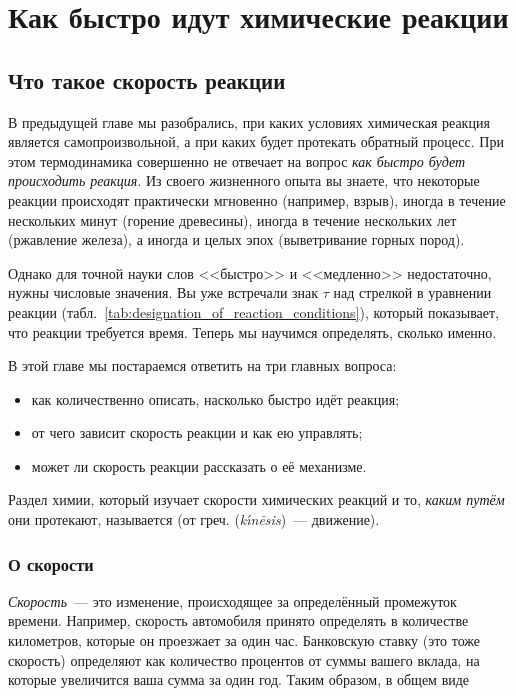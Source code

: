 \chapter{Как быстро идут химические реакции}

\section{Что такое скорость реакции}

В предыдущей главе мы разобрались, при каких условиях химическая реакция является самопроизвольной, а при каких будет протекать обратный процесс. При этом термодинамика совершенно не отвечает на вопрос \emph{как быстро будет происходить реакция}. Из своего жизненного опыта вы знаете, что некоторые реакции происходят практически мгновенно (например, взрыв), иногда в течение нескольких минут (горение древесины), иногда в течение нескольких лет (ржавление железа), а иногда и целых эпох (выветривание горных пород).

Однако для точной науки слов <<быстро>> и <<медленно>> недостаточно, нужны числовые значения. Вы уже встречали знак $\tau$ над стрелкой в уравнении реакции (табл.~\ref{tab:designation_of_reaction_conditions}), который показывает, что реакции требуется время. Теперь мы научимся определять, сколько именно.

В этой главе мы постараемся ответить на три главных вопроса:

\begin{itemize}
    \item как количественно описать, насколько быстро идёт реакция;
    \item от чего зависит скорость реакции и как ею управлять;
    \item может ли скорость реакции рассказать о её механизме.
\end{itemize}

Раздел химии, который изучает скорости химических реакций и то, \emph{каким путём} они протекают, называется  (от греч.  (\textit{k\'{\i}n\={e}sis})~--- движение).

\subsection*{О скорости}

\emph{Скорость}~--- это изменение, происходящее за определённый промежуток времени. Например, скорость автомобиля принято определять в количестве километров, которые он проезжает за один час. Банковскую ставку (это тоже скорость) определяют как количество процентов от суммы вашего вклада, на которые увеличится ваша сумма за один год. Таким образом, в общем виде

